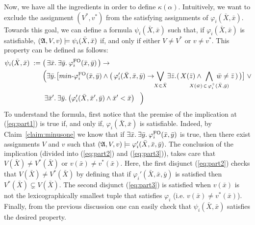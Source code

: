 Now, we have all the ingredients in order to define $\kappa(\alpha)$. 
Intuitively, we want to exclude the assignment $(V^*, v^*)$ from the satisfying assignments of $\varphi_i(\bar{X},\bar{x})$.
Towards this goal, we can define a formula $\psi_i(\bar{X},\bar{x})$ such that, if $\varphi_i(\bar{X}, \bar{x})$ is satisfiable, $(\mathfrak{A}, V, v) \models \psi_i(\bar{X},\bar{x})$ if, and only if either $V \neq V^*$ or $v \neq v^*$. 
This property can be defined as follows:
\begin{align}
\psi_i(\bar{X},\bar{x}) \; := \;  &\big( \, \ex{\bar{x}} \ex{\bar{y}} \varphi^{\fo}_i(\bar{x},\bar{y}) \,\big) \rightarrow  \label{eq:part1} \\
&\Big( 
\ex{\bar{y}}\!\big[ \text{$min$-}\varphi^{\fo}_i(\bar{x}, \bar{y}) \wedge \big( \, \varphi_i'(\bar{X},\bar{x}, \bar{y})  \rightarrow \!\! \bigvee_{X \in \bar{X}}\! \ex{\bar{z}}\!( \, X(\bar{z}) \wedge   \!\!\!\!\!\!\!\!\!\!\!\! \bigwedge\limits_{X(\bar{w}) \, \in \, \varphi^{+}_i(\bar{X},\bar{y})} \!\!\!\!\!\!\!\!\!\!\!\! \bar{w}\neq\bar{z} \, ) \, \big)\big] \;  \vee \!  \label{eq:part2} \\ 
&\; \ex{\bar{x}'} \ex{\bar{y}}\big( \varphi_i'(\bar{X},\bar{x}',\bar{y})\wedge \bar{x}' < \bar{x}\big) \; \;\; \Big)  \label{eq:part3}
\end{align}
To understand the formula, first notice that the premise of the implication at (\ref{eq:part1}) is true if, and only if, $\varphi_i(\bar{X}, \bar{x})$ is satisfiable. 
Indeed, by Claim~\ref{claim:minusone} we know that if $\exists{\bar{x}}.\: \exists{\bar{y}}.\: \varphi^{{\rm FO}}_i(\bar{x},\bar{y})$ is true, then there exist assignments $V$ and $v$ such that $(\mathfrak{A},V,v) \models\varphi_i'(\bar{X},\bar{x},\bar{y})$.
The conclusion of the implication (divided into (\ref{eq:part2}) and (\ref{eq:part3})), takes care that $V(\bar{X}) \neq V^*(\bar{X})$ or $v(\bar{x}) \neq v^*(\bar{x})$.
Here, the first disjunct (\ref{eq:part2}) checks that $V(\bar{X}) \neq V^*(\bar{X})$ by defining that if $\varphi_i'(\bar{X},\bar{x}, \bar{y})$ is satisfied then $V^*(\bar{X}) \subsetneq V(\bar{X})$. 
The second disjunct (\ref{eq:part3}) is satisfied when $v(\bar{x})$ is not the lexicographically smallest tuple that satisfies $\varphi_i$ (i.e. $v(\bar{x}) \neq v^*(\bar{x})$).
Finally, from the previous discussion one can easily check that $\psi_i(\bar{X},\bar{x})$ satisfies the desired property.

